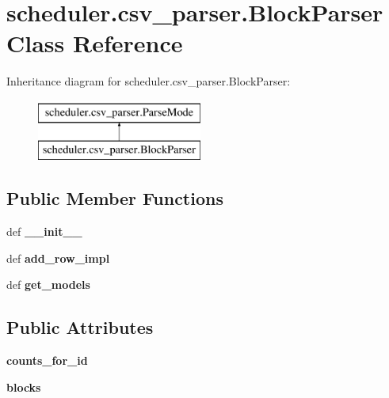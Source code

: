 \hypertarget{classscheduler_1_1csv__parser_1_1_block_parser}{\section{scheduler.\-csv\-\_\-parser.\-Block\-Parser Class Reference}
\label{classscheduler_1_1csv__parser_1_1_block_parser}
}
Inheritance diagram for scheduler.\-csv\-\_\-parser.\-Block\-Parser\-:\begin{figure}[H]
\begin{center}
\leavevmode
\includegraphics[height=2.000000cm]{classscheduler_1_1csv__parser_1_1_block_parser}
\end{center}
\end{figure}
\subsection*{Public Member Functions}
\begin{DoxyCompactItemize}
\item 
\hypertarget{classscheduler_1_1csv__parser_1_1_block_parser_a9a5711fb09811aa9038259fd3b4fb9f1}{def {\bfseries \-\_\-\-\_\-init\-\_\-\-\_\-}}\label{classscheduler_1_1csv__parser_1_1_block_parser_a9a5711fb09811aa9038259fd3b4fb9f1}

\item 
\hypertarget{classscheduler_1_1csv__parser_1_1_block_parser_a5a628ddc7ec3c88aeab1374c2d292716}{def {\bfseries add\-\_\-row\-\_\-impl}}\label{classscheduler_1_1csv__parser_1_1_block_parser_a5a628ddc7ec3c88aeab1374c2d292716}

\item 
\hypertarget{classscheduler_1_1csv__parser_1_1_block_parser_aef4d6fafd793bdc58454916e8c180ea7}{def {\bfseries get\-\_\-models}}\label{classscheduler_1_1csv__parser_1_1_block_parser_aef4d6fafd793bdc58454916e8c180ea7}

\end{DoxyCompactItemize}
\subsection*{Public Attributes}
\begin{DoxyCompactItemize}
\item 
\hypertarget{classscheduler_1_1csv__parser_1_1_block_parser_ad66ce7569665a2e7fa18757bd667a415}{{\bfseries counts\-\_\-for\-\_\-id}}\label{classscheduler_1_1csv__parser_1_1_block_parser_ad66ce7569665a2e7fa18757bd667a415}

\item 
\hypertarget{classscheduler_1_1csv__parser_1_1_block_parser_a9c7eef3b9448e1bb46784d493f1851a6}{{\bfseries blocks}}\label{classscheduler_1_1csv__parser_1_1_block_parser_a9c7eef3b9448e1bb46784d493f1851a6}

\end{DoxyCompactItemize}
